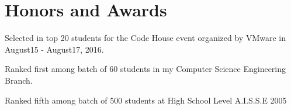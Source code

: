 \documentclass[letterpaper,10.8pt]{article}
\begin{document}
\section{Honors and Awards}
\begin{description}[font=$\bullet$]
 \item {Selected in top 20 students for the Code House event organized by VMware in August15 - August17, 2016.}
 \item {Ranked first among batch of 60 students in my Computer Science Engineering Branch.}
 \item {Ranked fifth among batch of 500 students at High School Level A.I.S.S.E 2005}
\end{description}
\end{document}
